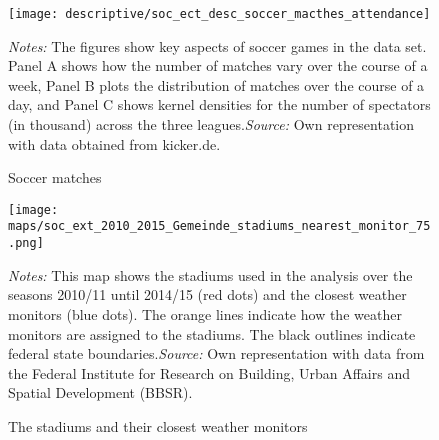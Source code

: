 \documentclass[11pt, a4paper]{article} %
\begin{document}
\vspace*{\fill}
\begin{figure}[H]\centering
	\caption{Soccer matches}\label{fig_soc_ext:descriptives_matches_time_attendance}
	\texttt{[image: descriptive/soc\_ect\_desc\_soccer\_macthes\_attendance]}	
	\begin{minipage}{\linewidth}
		\scriptsize{\emph{Notes:} The figures show key aspects of soccer games in the data set. Panel A shows how the number of matches vary over the course of a week, Panel B plots the distribution of matches over the course of a day, and Panel C shows kernel densities for the number of spectators (in thousand) across the three leagues.\newline \emph{Source:} Own representation with data obtained from kicker.de.}
	\end{minipage}
\end{figure}
\vspace*{\fill}\clearpage





\vspace*{\fill}
\begin{figure}[H]\centering
	\caption{The stadiums and their closest weather monitors}\label{fig_soc_ext:map_gem_stadiums_nearest_monitor}
	\texttt{[image: maps/soc\_ext\_2010\_2015\_Gemeinde\_stadiums\_nearest\_monitor\_75.png]}
	\begin{minipage}{0.95\linewidth}
		\scriptsize{\emph{Notes:} This map shows the stadiums used in the analysis over the seasons 2010/11 until 2014/15 (red dots) and the closest weather monitors (blue dots). The orange lines indicate how the weather monitors are assigned to the stadiums. The black outlines indicate federal state boundaries.\newline \emph{Source:} Own representation with data from the Federal Institute for Research on Building, Urban Affairs and Spatial Development (BBSR).}
	\end{minipage}
\end{figure}
\vspace*{\fill}\clearpage
\end{document}
